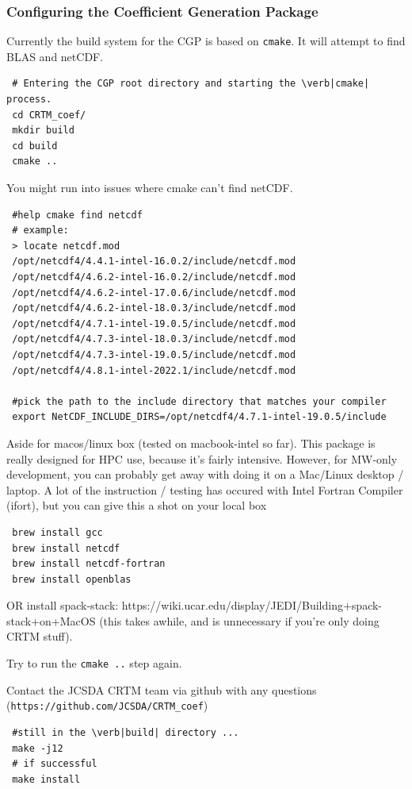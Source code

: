 \subsubsection{Configuring the Coefficient Generation Package}
Currently the build system for the CGP is based on \verb|cmake|.  It will attempt to find BLAS and netCDF.

\begin{verbatim}
 # Entering the CGP root directory and starting the \verb|cmake| process.
 cd CRTM_coef/
 mkdir build
 cd build
 cmake ..
\end{verbatim}

You might run into issues where cmake can't find netCDF.
\begin{verbatim}
 #help cmake find netcdf
 # example:
 > locate netcdf.mod
 /opt/netcdf4/4.4.1-intel-16.0.2/include/netcdf.mod
 /opt/netcdf4/4.6.2-intel-16.0.2/include/netcdf.mod
 /opt/netcdf4/4.6.2-intel-17.0.6/include/netcdf.mod
 /opt/netcdf4/4.6.2-intel-18.0.3/include/netcdf.mod
 /opt/netcdf4/4.7.1-intel-19.0.5/include/netcdf.mod
 /opt/netcdf4/4.7.3-intel-18.0.3/include/netcdf.mod
 /opt/netcdf4/4.7.3-intel-19.0.5/include/netcdf.mod
 /opt/netcdf4/4.8.1-intel-2022.1/include/netcdf.mod

 #pick the path to the include directory that matches your compiler 
 export NetCDF_INCLUDE_DIRS=/opt/netcdf4/4.7.1-intel-19.0.5/include
\end{verbatim}
 


Aside for macos/linux box (tested on macbook-intel so far).  This package is really designed for HPC use, because it's fairly intensive.  However, for MW-only development, you can probably get away with doing it on a Mac/Linux desktop / laptop. A lot of the instruction / testing has occured with Intel Fortran Compiler (ifort), but you can give this a shot on your local box
\begin{verbatim}
 brew install gcc
 brew install netcdf
 brew install netcdf-fortran
 brew install openblas
\end{verbatim}
OR install spack-stack:  https://wiki.ucar.edu/display/JEDI/Building+spack-stack+on+MacOS  (this takes awhile, and is unnecessary if you're only doing CRTM stuff).  

Try to run the \verb|cmake ..| step again.

Contact the JCSDA CRTM team via github with any questions (\verb|https://github.com/JCSDA/CRTM_coef|)

\begin{verbatim}
 #still in the \verb|build| directory ...
 make -j12
 # if successful
 make install
\end{verbatim}

